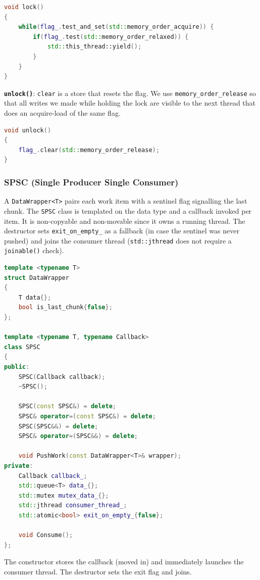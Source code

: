 \documentclass{article}
\begin{document}
\begin{lstlisting}[language=cpp,caption={Mutex::lock}]
void lock()
{
    while(flag_.test_and_set(std::memory_order_acquire)) {
        if(flag_.test(std::memory_order_relaxed)) {
            std::this_thread::yield();
        }
    }
}
\end{lstlisting}

\textbf{\texttt{unlock()}}: \texttt{clear} is a store that resets the flag. We use \texttt{memory\_order\_release} so that all writes we made while holding the lock are visible to the next thread that does an acquire-load of the same flag.

\begin{lstlisting}[language=cpp,caption={Mutex::unlock}]
void unlock()
{
    flag_.clear(std::memory_order_release);
}
\end{lstlisting}

\subsubsection{SPSC (Single Producer Single Consumer)}
A \texttt{DataWrapper<T>} pairs each work item with a sentinel flag signalling the last chunk. The \texttt{SPSC} class is templated on the data type and a callback invoked per item. It is non-copyable and non-movable since it owns a running thread. The destructor sets \texttt{exit\_on\_empty\_} as a fallback (in case the sentinel was never pushed) and joins the consumer thread (\texttt{std::jthread} does not require a \texttt{joinable()} check).

\begin{lstlisting}[language=cpp,caption={SPSC skeleton}]
template <typename T>
struct DataWrapper
{
    T data{};
    bool is_last_chunk{false};
};

template <typename T, typename Callback>
class SPSC
{
public:
    SPSC(Callback callback);
    ~SPSC();

    SPSC(const SPSC&) = delete;
    SPSC& operator=(const SPSC&) = delete;
    SPSC(SPSC&&) = delete;
    SPSC& operator=(SPSC&&) = delete;

    void PushWork(const DataWrapper<T>& wrapper);
private:
    Callback callback_;
    std::queue<T> data_{};
    std::mutex mutex_data_{};
    std::jthread consumer_thread_;
    std::atomic<bool> exit_on_empty_{false};

    void Consume();
};
\end{lstlisting}

The constructor stores the callback (moved in) and immediately launches the consumer thread. The destructor sets the exit flag and joins.
\end{document}

